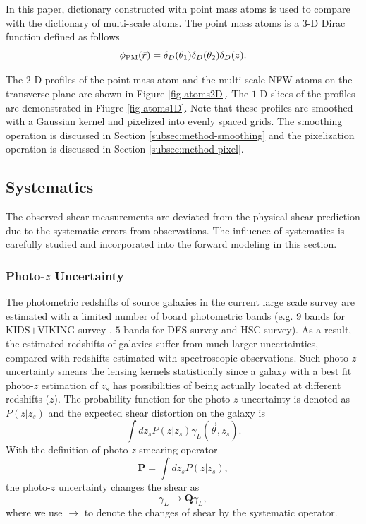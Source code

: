 \documentclass[twocolumn]{aastex62}
\begin{document}
In this paper, dictionary constructed with point mass atoms is used to compare with the dictionary of multi-scale atoms.
The point mass atoms is a $3$-D Dirac function defined as follows
\begin{equation}
\phi_{\rm{PM}}(\vec{r})= \delta_D(\theta_1) \delta_D(\theta_2) \delta_D(z).
\end{equation}

The $2$-D profiles of the point mass atom and the multi-scale NFW atoms on the transverse plane are shown in Figure
\ref{fig-atoms2D}. The $1$-D slices of the profiles are demonstrated in Fiugre \ref{fig-atoms1D}. Note that these profiles
are smoothed with a Gaussian kernel and pixelized into evenly spaced grids. The smoothing operation is discussed in
Section \ref{subsec:method-smoothing} and the pixelization operation is discussed in Section \ref{subsec:method-pixel}.

\subsection{Systematics}
\label{subsec:method-Systematics}

The observed shear measurements are deviated from the physical shear prediction due to the systematic
errors from observations. The influence of systematics is carefully studied and incorporated into the forward
modeling in this section.

\subsubsection{Photo-$z$ Uncertainty}
\label{subsec:method-photoz}

The photometric redshifts of source galaxies in the current large scale survey are estimated with a limited number of
board photometric bands (e.g. $9$ bands for KIDS$+$VIKING survey \citep{KIDS_VIKING-Hildebrant2020}, $5$ bands for DES
survey and HSC survey). As a result, the estimated redshifts of galaxies suffer from much larger uncertainties, compared
with redshifts estimated with spectroscopic observations. Such photo-$z$ uncertainty smears the lensing kernels statistically
since a galaxy with a best fit photo-$z$ estimation of $z_s$ has possibilities of being actually located at different
redshifts ($z$). The probability function for the photo-$z$ uncertainty is denoted as $P(z|z_s)$ and the expected shear
distortion on the galaxy is
\begin{equation}\label{eq-delta2gamma-poz}
\int dz_s P(z|z_s) \gamma_L(\vec{\theta},z_s).
\end{equation}
With the definition of photo-$z$ smearing operator
\begin{equation}
\mathbf{P} = \int dz_s P(z|z_s),
\end{equation}
the photo-$z$ uncertainty changes the shear as
\begin{equation}
\gamma_L \rightarrow \mathbf{Q} \gamma_L,
\end{equation}
where we use $\rightarrow$ to denote the changes of shear by the systematic operator.
\end{document}
